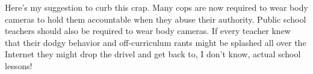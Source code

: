 Here's my suggestion to curb this crap. Many cops are now required to
wear body cameras to hold them accountable when they abuse their
authority. Public school teachers should also be required to wear body
cameras. If every teacher knew that their dodgy behavior and
off-curriculum rants might be splashed all over the Internet they might
drop the drivel and get back to, I don't know, actual school lessons!

%



%
 
 
 
